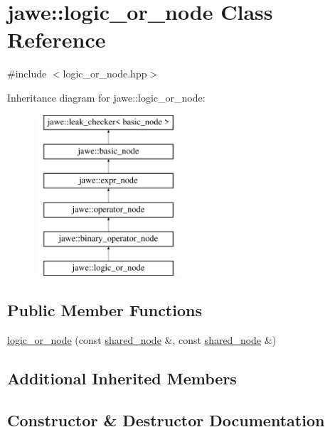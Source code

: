 \hypertarget{classjawe_1_1logic__or__node}{}\section{jawe\+:\+:logic\+\_\+or\+\_\+node Class Reference}
\label{classjawe_1_1logic__or__node}


{\ttfamily \#include $<$logic\+\_\+or\+\_\+node.\+hpp$>$}

Inheritance diagram for jawe\+:\+:logic\+\_\+or\+\_\+node\+:\begin{figure}[H]
\begin{center}
\leavevmode
\includegraphics[height=6.000000cm]{classjawe_1_1logic__or__node}
\end{center}
\end{figure}
\subsection*{Public Member Functions}
\begin{DoxyCompactItemize}
\item 
\hyperlink{classjawe_1_1logic__or__node_aa8a92357e7cad74daa59c5e3b004cd69}{logic\+\_\+or\+\_\+node} (const \hyperlink{namespacejawe_a3f307481d921b6cbb50cc8511fc2b544}{shared\+\_\+node} \&, const \hyperlink{namespacejawe_a3f307481d921b6cbb50cc8511fc2b544}{shared\+\_\+node} \&)
\end{DoxyCompactItemize}
\subsection*{Additional Inherited Members}


\subsection{Constructor \& Destructor Documentation}
\mbox{\label{classjawe_1_1logic__or__node_aa8a92357e7cad74daa59c5e3b004cd69}} 
